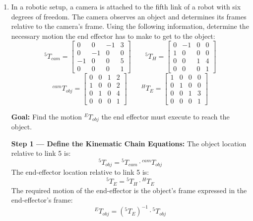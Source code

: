 \documentclass[12pt,a3paper]{article}
\begin{document}
\begin{enumerate}
\item \label{qlabel:C2-Q4}
In a robotic setup, a camera is attached to the fifth link of a robot with six degrees of freedom. The camera observes an object and determines its frames relative to the camera's frame. Using the following information, determine the necessary motion the end effector has to make to get to the object:
\[
  {}^5T_{cam} = \begin{bmatrix}
    0 & 0 & -1 & 3 \\
    0 & -1 & 0 & 0 \\
    -1 & 0 & 0 & 5 \\
    0 & 0 & 0 & 1
  \end{bmatrix} \qquad
  {}^5T_H = \begin{bmatrix}
    0 & -1 & 0 & 0 \\
    1 & 0 & 0 & 0 \\
    0 & 0 & 1 & 4 \\
    0 & 0 & 0 & 1
  \end{bmatrix}
\]
\[
  {}^{cam}T_{obj} = \begin{bmatrix}
    0 & 0 & 1 & 2 \\
    1 & 0 & 0 & 2 \\
    0 & 1 & 0 & 4 \\
    0 & 0 & 0 & 1
  \end{bmatrix} \qquad
  {}^HT_E = \begin{bmatrix}
    1 & 0 & 0 & 0 \\
    0 & 1 & 0 & 0 \\
    0 & 0 & 1 & 3 \\
    0 & 0 & 0 & 1
  \end{bmatrix}
\]

\begin{tcolorbox}[enhanced,breakable,ansbox,colback=cB!4,colframe=cB,
  boxrule=0.8pt,arc=5pt,
  title={\textbf{Answer}},fonttitle=\bfseries\color{white},
  colbacktitle=cB]

\textbf{Goal:} Find the motion ${}^ET_{obj}$ the end effector must execute to reach the object.

\medskip
\textbf{Step 1 — Define the Kinematic Chain Equations:}
The object location relative to link 5 is:
\[
  {}^5T_{obj} = {}^5T_{cam} \cdot {}^{cam}T_{obj}
\]
The end-effector location relative to link 5 is:
\[
  {}^5T_E = {}^5T_H \cdot {}^HT_E
\]
The required motion of the end-effector is the object's frame expressed in the end-effector's frame:
\[
  {}^ET_{obj} = ({}^5T_E)^{-1} \cdot {}^5T_{obj}
\]


\end{tcolorbox}
\end{enumerate}
\end{document}
